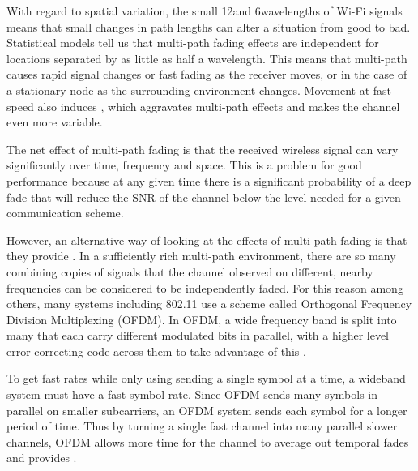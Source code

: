 With regard to spatial variation, the small 12\cm and 6\cm wavelengths of Wi-Fi signals means that small changes in path lengths can alter a situation from good to bad. Statistical models tell us that multi-path fading effects are independent for locations separated by as little as half a wavelength. This means that multi-path causes rapid signal changes or fast fading as the receiver moves, or in the case of a stationary node as the surrounding environment changes.  Movement at fast speed also induces , which aggravates multi-path effects and makes the channel even more variable.

The net effect of multi-path fading is that the received wireless signal can vary significantly over time, frequency and space. This is a problem for good performance because at any given time there is a significant probability of a deep fade that will reduce the SNR of the channel below the level needed for a given communication scheme.

However, an alternative way of looking at the effects of multi-path fading is that they provide . In a sufficiently rich multi-path environment, there are so many combining copies of signals that the channel observed on different, nearby frequencies can be considered to be independently faded. For this reason among others, many systems including 802.11 use a scheme called Orthogonal Frequency Division Multiplexing (OFDM). In OFDM, a wide frequency band is split into many  that each carry different modulated bits in parallel, with a higher level error-correcting code across them to take advantage of this .

To get fast rates while only using sending a single symbol at a time, a wideband system must have a fast symbol rate. Since OFDM sends many symbols in parallel on smaller subcarriers, an OFDM system sends each symbol for a longer period of time. Thus by turning a single fast channel into many parallel slower channels, OFDM allows more time for the channel to average out temporal fades and provides .

